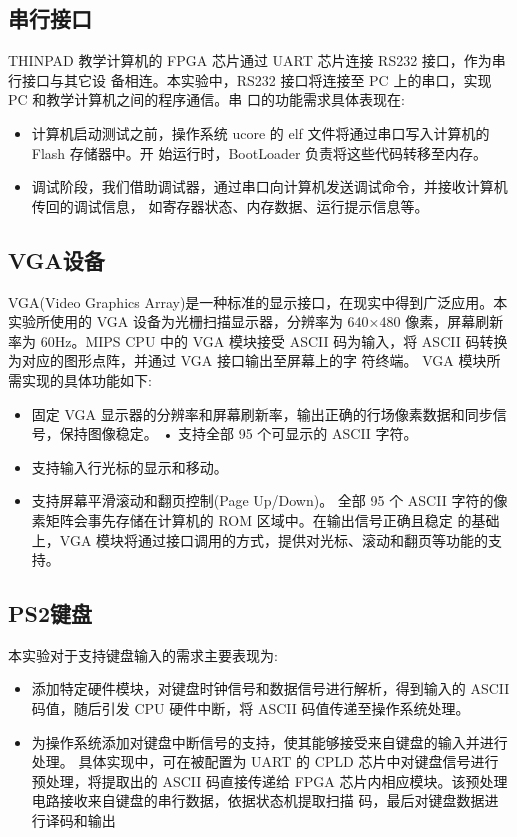 \documentclass[11pt,utf8]{article}
\begin{document}
\subsection{串行接口}
THINPAD 教学计算机的 FPGA 芯片通过 UART 芯片连接 RS232 接口，作为串行接口与其它设 备相连。本实验中，RS232 接口将连接至 PC 上的串口，实现 PC 和教学计算机之间的程序通信。串 口的功能需求具体表现在:
\begin{itemize}
\item 计算机启动测试之前，操作系统 ucore 的 elf 文件将通过串口写入计算机的 Flash 存储器中。开 始运行时，BootLoader 负责将这些代码转移至内存。
\item 调试阶段，我们借助调试器，通过串口向计算机发送调试命令，并接收计算机传回的调试信息， 如寄存器状态、内存数据、运行提示信息等。
\end{itemize}
\subsection{VGA设备}
VGA(Video Graphics Array)是一种标准的显示接口，在现实中得到广泛应用。本实验所使用的 VGA 设备为光栅扫描显示器，分辨率为 640×480 像素，屏幕刷新率为 60Hz。MIPS CPU 中的 VGA 模块接受 ASCII 码为输入，将 ASCII 码转换为对应的图形点阵，并通过 VGA 接口输出至屏幕上的字 符终端。
VGA 模块所需实现的具体功能如下:
\begin{itemize}
\item 固定 VGA 显示器的分辨率和屏幕刷新率，输出正确的行场像素数据和同步信号，保持图像稳定。 • 支持全部 95 个可显示的 ASCII 字符。
\item 支持输入行光标的显示和移动。
\item 支持屏幕平滑滚动和翻页控制(Page Up/Down)。
全部 95 个 ASCII 字符的像素矩阵会事先存储在计算机的 ROM 区域中。在输出信号正确且稳定 的基础上，VGA 模块将通过接口调用的方式，提供对光标、滚动和翻页等功能的支持。
\end{itemize}
\subsection{PS2键盘}
本实验对于支持键盘输入的需求主要表现为:
\begin{itemize}
\item 添加特定硬件模块，对键盘时钟信号和数据信号进行解析，得到输入的 ASCII 码值，随后引发 CPU 硬件中断，将 ASCII 码值传递至操作系统处理。
\item 为操作系统添加对键盘中断信号的支持，使其能够接受来自键盘的输入并进行处理。
具体实现中，可在被配置为 UART 的 CPLD 芯片中对键盘信号进行预处理，将提取出的 ASCII 码直接传递给 FPGA 芯片内相应模块。该预处理电路接收来自键盘的串行数据，依据状态机提取扫描 码，最后对键盘数据进行译码和输出
\end{itemize}
\end{document}
